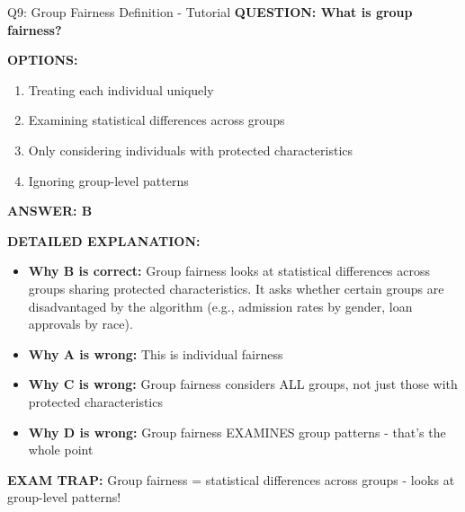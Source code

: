 \documentclass[8pt]{beamer}
\begin{document}
	\begin{frame}{Q9: Group Fairness Definition - Tutorial}
		\fontsize{6.5}{7.5}\selectfont
		\textbf{QUESTION: What is group fairness?}
		
		\vspace{0.1cm}
		\textbf{OPTIONS:}
		\begin{enumerate}
			\item Treating each individual uniquely
			\item Examining statistical differences across groups
			\item Only considering individuals with protected characteristics
			\item Ignoring group-level patterns
		\end{enumerate}
		
		\vspace{0.1cm}
		\textcolor{myblue}{\textbf{ANSWER: B}}
		
		\vspace{0.1cm}
		\textbf{DETAILED EXPLANATION:}
		\begin{itemize}
			\item \textbf{Why B is correct:} Group fairness looks at statistical differences across groups sharing protected characteristics. It asks whether certain groups are disadvantaged by the algorithm (e.g., admission rates by gender, loan approvals by race).
			\item \textbf{Why A is wrong:} This is individual fairness
			\item \textbf{Why C is wrong:} Group fairness considers ALL groups, not just those with protected characteristics
			\item \textbf{Why D is wrong:} Group fairness EXAMINES group patterns - that's the whole point
		\end{itemize}
		
		\textcolor{myred}{\textbf{EXAM TRAP:}} Group fairness = \textcolor{myblue}{statistical differences across groups} - looks at group-level patterns!
	\end{frame}
	
\end{document}
